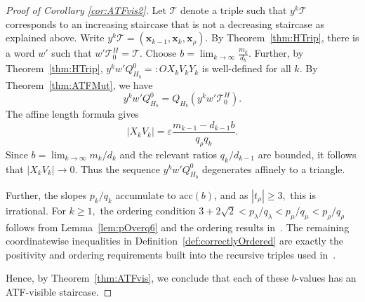 \documentclass[11pt, reqno]{amsart}
\theoremstyle{remark}
\numberwithin{equation}{subsection}
\numberwithin{figure}{section}
\theoremstyle{customremark}
\newcommand{\Tt}{\mathcal{T}}
\newcommand{\eps}{\varepsilon}
\newcommand{\acc}{\mathrm{acc}}
\begin{document}
\begin{proof}[Proof of Corollary \ref{cor:ATFvis2}]
    Let $\Tt$ denote a triple such that $y^k\Tt$ corresponds to an increasing staircase that is not a decreasing staircase as explained above. Write $y^k\Tt=(\bm{x}_{k-1},\bm{x}_k,\bm{x}_\rho)$. By Theorem~\ref{thm:HTrip}, there is a word $w'$ such that $w'\Tt_0^H=\Tt$. Choose $b=\lim_{k \to \infty} \frac{m_{k}}{d_{k}}.$ Further, by Theorem~\ref{thm:HTrip}, $y^kw'Q_{H_b}^0=:OX_kV_kY_k$ is well-defined for all $k.$ 
    By Theorem~\ref{thm:ATFMut}, we have
\[
y^kw'Q_{H_b}^0=Q_{H_b}(y^kw'\Tt_0^H).
\]
The affine length formula gives
\[
|X_kV_k|=\eps\frac{m_{k-1}-d_{k-1}b}{q_\rho q_k}.
\]
Since $b=\lim_{k\to\infty}m_k/d_k$ and the relevant ratios $q_k/d_{k-1}$ are bounded, it follows that $|X_kV_k| \to 0$. Thus the sequence $y^kw'Q_{H_b}^0$ degenerates affinely to a triangle.

    Further, the slopes $p_k/q_k$ accumulate to $\acc(b)$, and as $|t_\rho| \geq 3,$ this is irrational.  For $k \geq 1,$ the ordering condition \(3+2\sqrt2<p_\lambda/q_\lambda<p_\mu/q_\mu<p_\rho/q_\rho\) follows from Lemma~\ref{lem:pOverq6} and the ordering results in~\cite[Definition 2.1.6]{MMW}. The remaining coordinatewise inequalities in Definition~\ref{def:correctlyOrdered} are exactly the positivity and ordering requirements built into the recursive triples used in~\cite[Definition 2.1.6]{MMW}.

    Hence, by Theorem~\ref{thm:ATFvis}, we conclude that each of these $b$-values has an ATF-visible staircase.  
\end{proof}
\end{document}
